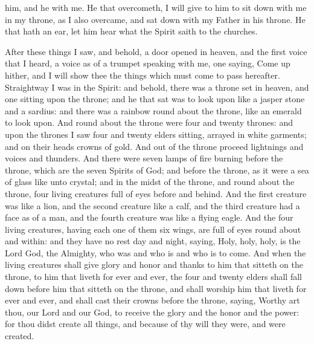 him, and he with me. He that overcometh, I will give to him to sit down with me in my throne, as I also overcame, and sat down with my Father in his throne. He that hath an ear, let him hear what the Spirit saith to the churches. 

After these things I saw, and behold, a door opened in heaven, and the first voice that I heard, a voice as of a trumpet speaking with me, one saying, Come up hither, and I will show thee the things which must come to pass hereafter. Straightway I was in the Spirit: and behold, there was a throne set in heaven, and one sitting upon the throne; and he that sat was to look upon like a jasper stone and a sardius: and there was a rainbow round about the throne, like an emerald to look upon. And round about the throne were four and twenty thrones: and upon the thrones I saw four and twenty elders sitting, arrayed in white garments; and on their heads crowns of gold. And out of the throne proceed lightnings and voices and thunders. And there were seven lamps of fire burning before the throne, which are the seven Spirits of God; and before the throne, as it were a sea of glass like unto crystal; and in the midst of the throne, and round about the throne, four living creatures full of eyes before and behind. And the first creature was like a lion, and the second creature like a calf, and the third creature had a face as of a man, and the fourth creature was like a flying eagle. And the four living creatures, having each one of them six wings, are full of eyes round about and within: and they have no rest day and night, saying, Holy, holy, holy, is the Lord God, the Almighty, who was and who is and who is to come.  And when the living creatures shall give glory and honor and thanks to him that sitteth on the throne, to him that liveth for ever and ever, the four and twenty elders shall fall down before him that sitteth on the throne, and shall worship him that liveth for ever and ever, and shall cast their crowns before the throne, saying,  Worthy art thou, our Lord and our God, to receive the glory and the honor and the power: for thou didst create all things, and because of thy will they were, and were created. 


